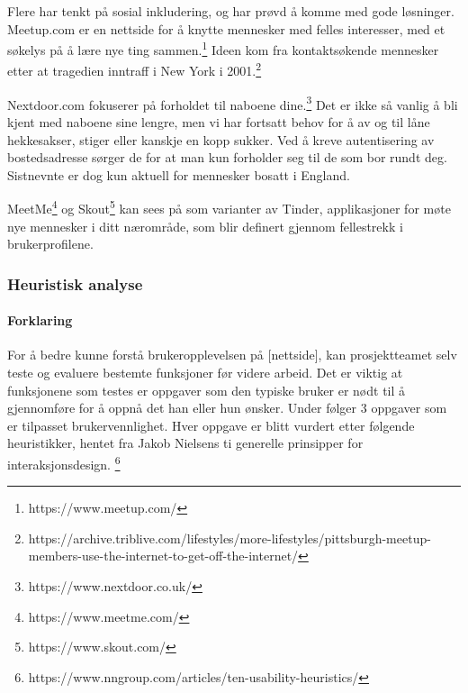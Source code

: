 \vspace{5mm} %
Flere har tenkt på sosial inkludering, og har prøvd å komme med gode løsninger. Meetup.com er en nettside for å knytte mennesker med felles interesser, med et søkelys på å lære nye ting sammen.\footnote{https://www.meetup.com/} Ideen kom fra kontaktsøkende mennesker etter at tragedien inntraff i New York i 2001.\footnote{https://archive.triblive.com/lifestyles/more-lifestyles/pittsburgh-meetup-members-use-the-internet-to-get-off-the-internet/}

Nextdoor.com fokuserer på forholdet til naboene dine.\footnote{https://www.nextdoor.co.uk/} Det er ikke så vanlig å bli kjent med naboene sine lengre, men vi har fortsatt behov for å av og til låne hekkesakser, stiger eller kanskje en kopp sukker. Ved å kreve autentisering av bostedsadresse sørger de for at man kun forholder seg til de som bor rundt deg. Sistnevnte er dog kun aktuell for mennesker bosatt i England.

MeetMe\footnote{https://www.meetme.com/} og Skout\footnote{https://www.skout.com/} kan sees på som varianter av Tinder, applikasjoner for møte nye mennesker i ditt nærområde, som blir definert gjennom fellestrekk i brukerprofilene.

\subsubsection{Heuristisk analyse}

\paragraph{Forklaring}

For å bedre kunne forstå brukeropplevelsen på [nettside], kan prosjektteamet selv teste og evaluere bestemte funksjoner før videre arbeid. Det er viktig at funksjonene som testes er oppgaver som den typiske bruker er nødt til å gjennomføre for å oppnå det han eller hun ønsker.
\linebreak 
Under følger 3 oppgaver som er tilpasset brukervennlighet. Hver oppgave er blitt vurdert etter følgende heuristikker, hentet fra Jakob Nielsens ti generelle prinsipper for interaksjonsdesign. \footnote{https://www.nngroup.com/articles/ten-usability-heuristics/}

